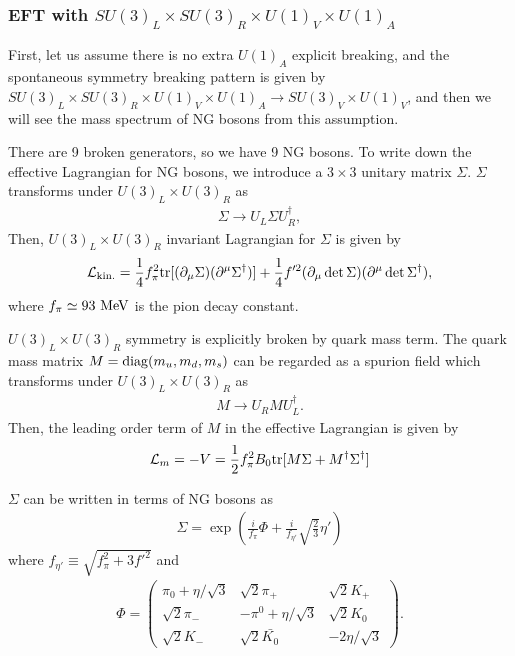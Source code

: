 \documentclass[11pt,a4paper]{article}
\begin{document}
\subsubsection{EFT with $SU(3)_L \times SU(3)_R \times U(1)_V \times U(1)_A$}
First, let us assume there is no extra $U(1)_A$ explicit breaking, and the spontaneous symmetry breaking pattern is given by $SU(3)_L \times SU(3)_R \times U(1)_V \times U(1)_A \to SU(3)_V \times U(1)_V$, and then we will see the mass spectrum of NG bosons from this assumption.

There are 9 broken generators, so we have 9 NG bosons. To write down the effective Lagrangian for NG bosons, we introduce a $3\times 3$ unitary matrix $\Sigma$. $\Sigma$ transforms under $U(3)_L \times U(3)_R$ as
\begin{align}
    \Sigma \to U_L \Sigma U_R^\dagger,
\end{align}
Then, $U(3)_L \times U(3)_R$ invariant Lagrangian for $\Sigma$ is given by
\begin{align}
    {\cal L}_{\rm kin.} = \frac{1}{4} f_\pi^2 {\rm tr}[(\partial_\mu \Sigma)(\partial^\mu \Sigma^\dagger)] + \frac{1}{4} f'^2 (\partial_\mu \det \Sigma)(\partial^\mu \det \Sigma^\dagger),
\end{align}
where $f_\pi \simeq 93~{\rm MeV}$ is the pion decay constant.

$U(3)_L \times U(3)_R$ symmetry is explicitly broken by quark mass term. The quark mass matrix $M = {\rm diag}(m_u, m_d, m_s)$ can be regarded as a spurion field which transforms under $U(3)_L \times U(3)_R$ as
\begin{align}
    M \to U_R M U_L^\dagger.
\end{align}
Then, the leading order term of $M$ in the effective Lagrangian is given by
\begin{align}
    {\cal L}_m = -V =\frac{1}{2} f_\pi^2 B_0 {\rm tr}[M \Sigma + M^\dagger \Sigma^\dagger] \label{eq:chpt potential}
\end{align}

$\Sigma$ can be written in terms of NG bosons as
\begin{align}
    \Sigma = \exp\left( \frac{i}{f_\pi} \Phi  + \frac{i}{f_{\eta'}} \sqrt{\frac{2}{3}} \eta' \right)
\end{align}
where $f_{\eta'} \equiv \sqrt{f_\pi^2 + 3f'^2}$ and 
\begin{align}
    \Phi = 
        \left(\begin{array}{ccc}
            \pi_0 + \eta/\sqrt{3} & \sqrt{2} \pi_+         & \sqrt{2} K_+\\
            \sqrt{2} \pi_-        & -\pi^0 + \eta/\sqrt{3} & \sqrt{2} K_0\\
            \sqrt{2} K_-          & \sqrt{2}\bar{K_0}      & -2\eta/\sqrt{3}
        \end{array}\right).
\end{align}
\end{document}
